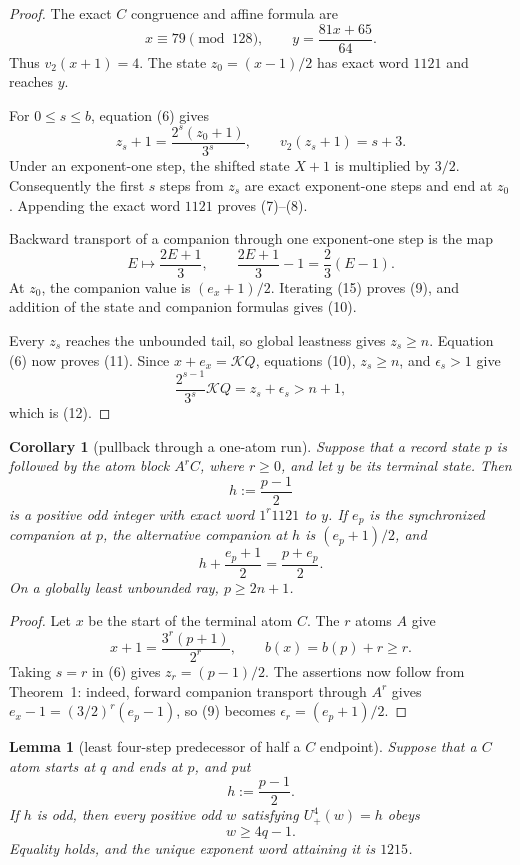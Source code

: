 \documentclass[11pt]{article}
\newtheorem{corollary}[theorem]{Corollary}
\newtheorem{lemma}[theorem]{Lemma}
\newcommand{\Up}{U_+}
\begin{document}
\begin{proof}
The exact $C$ congruence and affine formula are
\[
 x\equiv79\pmod {128},
 \qquad
 y=\frac{81x+65}{64}.
 \tag{13}
\]
Thus $v_2(x+1)=4$.  The state $z_0=(x-1)/2$ has exact word $1121$ and
reaches $y$.

For $0\leq s\leq b$, equation (6) gives
\[
 z_s+1=\frac{2^s(z_0+1)}{3^s},
 \qquad
 v_2(z_s+1)=s+3.
 \tag{14}
\]
Under an exponent-one step, the shifted state $X+1$ is multiplied by
$3/2$.  Consequently the first $s$ steps from $z_s$ are exact
exponent-one steps and end at $z_0$.  Appending the exact word $1121$
proves (7)--(8).

Backward transport of a companion through one exponent-one step is the
map
\[
 E\longmapsto\frac{2E+1}{3},
 \qquad
 \frac{2E+1}{3}-1=\frac23(E-1).
 \tag{15}
\]
At $z_0$, the companion value is $(e_x+1)/2$.  Iterating (15) proves
(9), and addition of the state and companion formulas gives (10).

Every $z_s$ reaches the unbounded tail, so global leastness gives
$z_s\geq n$.  Equation (6) now proves (11).  Since
$x+e_x=\mathcal KQ$, equations (10), $z_s\geq n$, and
$\epsilon_s>1$ give
\[
 \frac{2^{s-1}}{3^s}\mathcal KQ
 =z_s+\epsilon_s>n+1,
\]
which is (12).
\end{proof}

\begin{corollary}[pullback through a one-atom run]
Suppose that a record state $p$ is followed by the atom block $A^rC$,
where $r\geq0$, and let $y$ be its terminal state.  Then
\[
 \boxed{h:=\frac{p-1}{2}}
 \tag{16}
\]
is a positive odd integer with exact word $1^r1121$ to $y$.  If $e_p$ is
the synchronized companion at $p$, the alternative companion at $h$ is
$(e_p+1)/2$, and
\[
 h+\frac{e_p+1}{2}=\frac{p+e_p}{2}.
 \tag{17}
\]
On a globally least unbounded ray, $p\geq2n+1$.
\end{corollary}

\begin{proof}
Let $x$ be the start of the terminal atom $C$.  The $r$ atoms $A$ give
\[
 x+1=\frac{3^r(p+1)}{2^r},
 \qquad
 b(x)=b(p)+r\geq r.
 \tag{18}
\]
Taking $s=r$ in (6) gives $z_r=(p-1)/2$.  The assertions now follow
from Theorem~1: indeed, forward companion transport through $A^r$ gives
$e_x-1=(3/2)^r(e_p-1)$, so (9) becomes
$\epsilon_r=(e_p+1)/2$.
\end{proof}

\begin{lemma}[least four-step predecessor of half a $C$ endpoint]
Suppose that a $C$ atom starts at $q$ and ends at $p$, and put
\[
 h:=\frac{p-1}{2}.
 \tag{19}
\]
If $h$ is odd, then every positive odd $w$ satisfying
$\Up^4(w)=h$ obeys
\[
 \boxed{w\geq4q-1.}
 \tag{20}
\]
Equality holds, and the unique exponent word attaining it is $1215$.
\end{lemma}
\end{document}
